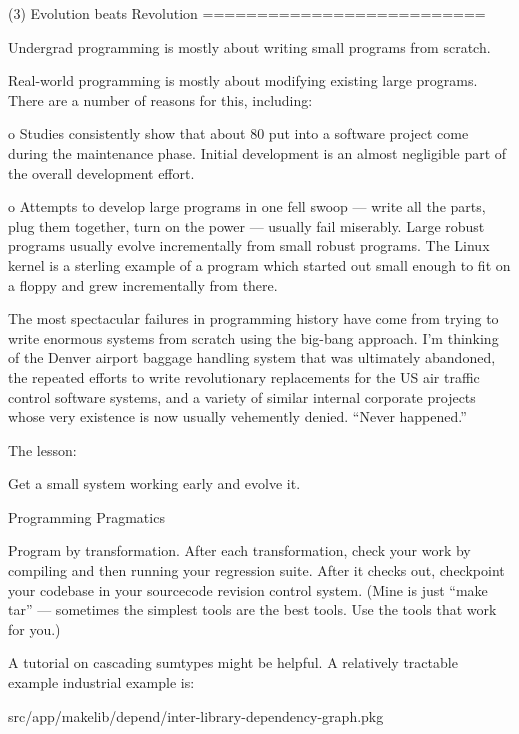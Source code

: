 (3) Evolution beats Revolution 
    ==========================

    Undergrad programming is mostly about writing small programs from scratch.

    Real-world programming is mostly about modifying existing large programs.
    There are a number of reasons for this, including:

     o Studies consistently show that about 80%
       put into a software project come during the maintenance phase.
       Initial development is an almost negligible part of the overall 
       development effort.

     o Attempts to develop large programs in one fell swoop  --- write all 
       the parts, plug them together, turn on the power  --- usually fail 
       miserably.  Large robust programs usually evolve incrementally from 
       small robust programs.  The Linux kernel is a sterling example of 
       a program which started out small enough to fit on a floppy and 
       grew incrementally from there.

     The most spectacular failures in programming history have come from 
     trying to write enormous systems from scratch using the big-bang 
     approach.  I'm thinking of the Denver airport baggage handling system 
     that was ultimately abandoned, the repeated efforts to write revolutionary 
     replacements for the US air traffic control software systems, and a 
     variety of similar internal corporate projects whose very existence is 
     now usually vehemently denied.  ``Never happened.''

     The lesson:

         Get a small system working early and evolve it.




Programming Pragmatics 

Program by transformation.  After each transformation, check your work 
by compiling and then running your regression suite.  After it checks 
out, checkpoint your codebase in your sourcecode revision control system. 
(Mine is just ``make tar''  --- sometimes the simplest tools are the best tools.
Use the tools that work for you.)



A tutorial on cascading sumtypes might be helpful.  A relatively tractable 
example industrial example is:

    src/app/makelib/depend/inter-library-dependency-graph.pkg 



